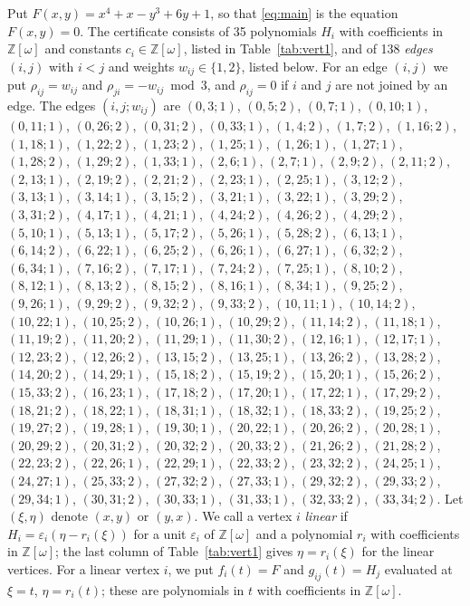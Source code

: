 \documentclass[11pt]{article}
\newcommand{\Z}{\mathbb{Z}}
\begin{document}
Put $F(x,y)=x^{4}+x-y^{3}+6y+1$, so that \eqref{eq:main} is the equation $F(x,y)=0$. The certificate consists of 35 polynomials $H_i$ with coefficients in $\Z[\omega]$ and constants $c_i\in\Z[\omega]$, listed in Table~\ref{tab:vert1}, and of 138 \emph{edges} $(i,j)$ with $i<j$ and weights $w_{ij}\in\{1,2\}$, listed below. For an edge $(i,j)$ we put $\rho_{ij}=w_{ij}$ and $\rho_{ji}=-w_{ij}\bmod 3$, and $\rho_{ij}=0$ if $i$ and $j$ are not joined by an edge.
The edges $(i,j;w_{ij})$ are $(0,3;1)$, $(0,5;2)$, $(0,7;1)$, $(0,10;1)$, $(0,11;1)$, $(0,26;2)$, $(0,31;2)$, $(0,33;1)$, $(1,4;2)$, $(1,7;2)$, $(1,16;2)$, $(1,18;1)$, $(1,22;2)$, $(1,23;2)$, $(1,25;1)$, $(1,26;1)$, $(1,27;1)$, $(1,28;2)$, $(1,29;2)$, $(1,33;1)$, $(2,6;1)$, $(2,7;1)$, $(2,9;2)$, $(2,11;2)$, $(2,13;1)$, $(2,19;2)$, $(2,21;2)$, $(2,23;1)$, $(2,25;1)$, $(3,12;2)$, $(3,13;1)$, $(3,14;1)$, $(3,15;2)$, $(3,21;1)$, $(3,22;1)$, $(3,29;2)$, $(3,31;2)$, $(4,17;1)$, $(4,21;1)$, $(4,24;2)$, $(4,26;2)$, $(4,29;2)$, $(5,10;1)$, $(5,13;1)$, $(5,17;2)$, $(5,26;1)$, $(5,28;2)$, $(6,13;1)$, $(6,14;2)$, $(6,22;1)$, $(6,25;2)$, $(6,26;1)$, $(6,27;1)$, $(6,32;2)$, $(6,34;1)$, $(7,16;2)$, $(7,17;1)$, $(7,24;2)$, $(7,25;1)$, $(8,10;2)$, $(8,12;1)$, $(8,13;2)$, $(8,15;2)$, $(8,16;1)$, $(8,34;1)$, $(9,25;2)$, $(9,26;1)$, $(9,29;2)$, $(9,32;2)$, $(9,33;2)$, $(10,11;1)$, $(10,14;2)$, $(10,22;1)$, $(10,25;2)$, $(10,26;1)$, $(10,29;2)$, $(11,14;2)$, $(11,18;1)$, $(11,19;2)$, $(11,20;2)$, $(11,29;1)$, $(11,30;2)$, $(12,16;1)$, $(12,17;1)$, $(12,23;2)$, $(12,26;2)$, $(13,15;2)$, $(13,25;1)$, $(13,26;2)$, $(13,28;2)$, $(14,20;2)$, $(14,29;1)$, $(15,18;2)$, $(15,19;2)$, $(15,20;1)$, $(15,26;2)$, $(15,33;2)$, $(16,23;1)$, $(17,18;2)$, $(17,20;1)$, $(17,22;1)$, $(17,29;2)$, $(18,21;2)$, $(18,22;1)$, $(18,31;1)$, $(18,32;1)$, $(18,33;2)$, $(19,25;2)$, $(19,27;2)$, $(19,28;1)$, $(19,30;1)$, $(20,22;1)$, $(20,26;2)$, $(20,28;1)$, $(20,29;2)$, $(20,31;2)$, $(20,32;2)$, $(20,33;2)$, $(21,26;2)$, $(21,28;2)$, $(22,23;2)$, $(22,26;1)$, $(22,29;1)$, $(22,33;2)$, $(23,32;2)$, $(24,25;1)$, $(24,27;1)$, $(25,33;2)$, $(27,32;2)$, $(27,33;1)$, $(29,32;2)$, $(29,33;2)$, $(29,34;1)$, $(30,31;2)$, $(30,33;1)$, $(31,33;1)$, $(32,33;2)$, $(33,34;2)$.
Let $(\xi,\eta)$ denote $(x,y)$ or $(y,x)$. We call a vertex $i$ \emph{linear} if $H_i=\varepsilon_i(\eta-r_i(\xi))$ for a unit $\varepsilon_i$ of $\Z[\omega]$ and a polynomial $r_i$ with coefficients in $\Z[\omega]$; the last column of Table~\ref{tab:vert1} gives $\eta=r_i(\xi)$ for the linear vertices. For a linear vertex $i$, we put $f_i(t)=F$ and $g_{ij}(t)=H_j$ evaluated at $\xi=t$, $\eta=r_i(t)$; these are polynomials in $t$ with coefficients in $\Z[\omega]$.
\end{document}
